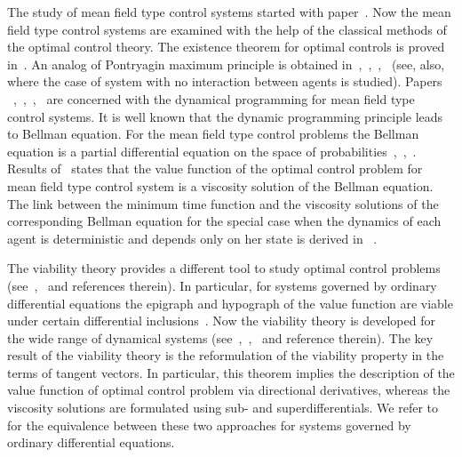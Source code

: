 \documentclass[12pt]{article}
\begin{document}
The study of mean field type control systems started with  paper~\cite{ahmed_ding_controlld}. Now the mean field type control systems are examined with the help of the classical methods of the optimal control theory. The existence theorem for optimal controls is proved in~\cite{Bahlali_Mezerdi_Mezerdi_existence}.  An analog of Pontryagin maximum principle is obtained in~\cite{Andersson_Djehiche_2011},~\cite{Bensoussan_Frehse_Yam_book},~\cite{Buckdahn_Boualem_Li_PMP_SDE},~\cite{Carmona_Delarue_PMP} (see, also, \cite{Pogodaev} where the case of system with no interaction between agents is studied). Papers ~\cite{Bayraktar_Cosso_Pham_randomized},~\cite{Bensoussan_Frehse_Yam_book},~\cite{Lauriere_Pironneau_DPP_MF_control},~\cite{Pham_Wei_2015_DPP_2016} are concerned with the dynamical programming for mean field type control systems. It is well known that the dynamic programming principle leads to Bellman equation. For the mean field type control problems the Bellman equation is a partial differential equation on the space of probabilities~\cite{Bensoussan_Frehse_Yam_book},~\cite{Bensoussan_Frehse_Yam_equation},~\cite{Carmona_Delarue_master_brief}. Results of~\cite{Pham_Wei_2015_Bellman} states that the value function of the optimal control problem for mean field type control system is a viscosity solution of the Bellman equation.  The link between the minimum time function and the viscosity solutions of the corresponding Bellman equation for the  special case when the dynamics of each agent is deterministic and depends only on her state is derived in ~\cite{Marigonda_et_al_2015}. 

The viability theory provides a different tool to study optimal control problems (see~\cite{Aubin_new},~\cite{Subb_book} and references therein). In particular, for systems governed by ordinary differential equations the epigraph and hypograph of the value function are viable under certain differential inclusions~\cite{Subb_book}. Now the viability theory is developed for the wide range of dynamical systems (see~\cite{Aubin},~\cite{Aubin_new},~\cite{Aubin_Cellina} and reference therein). The key result of the viability theory is the reformulation of the viability property in the terms of tangent vectors. In particular, this theorem implies the description of the value function of optimal control problem via directional derivatives, whereas the viscosity solutions are formulated using sub- and superdifferentials. We refer to~\cite{Subb_book} for the equivalence between these two approaches for systems governed by ordinary differential equations. 
\end{document}
